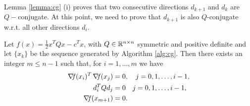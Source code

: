 \documentclass[10pt,a4paper]{article}
\begin{document}
\noindent Lemma \ref{lemma:cg} (i) proves that two consecutive directions $d_{k+1}$ and $d_k$ are $Q-$conjugate. At this point, we need to prove that $d_{k+1}$ is also $Q$-conjugate w.r.t. all other directions $d_i$.

\begin{proposition}
	Let $f(x) =\frac{1}{2}x^TQx -c^Tx$, with $Q\in \mathbb{R}^{n\times n}$ symmetric and positive definite and let $\{x_k\}$ be the sequence generated by Algorithm \ref{alg:cg}. Then there exists an integer $m \leq n - 1$ such that, for $i = 1, \ldots, m$ we have
	\begin{align}
		\operatorname*{\mathit{\nabla \!f}}(x_i)^T \operatorname*{\mathit{\nabla \!f}}(x_j) &= 0, \quad j = 0, 1, \ldots, i - 1, \label{eq:cg_orth}\\
		d_i^T Q d_j &= 0 \quad j = 0, 1, \ldots, i - 1, \label{eq:cg_conj} \\
		\operatorname*{\mathit{\nabla \!f}}(x_{m+1}) &= 0. 
	\end{align}
\end{proposition}
\end{document}
